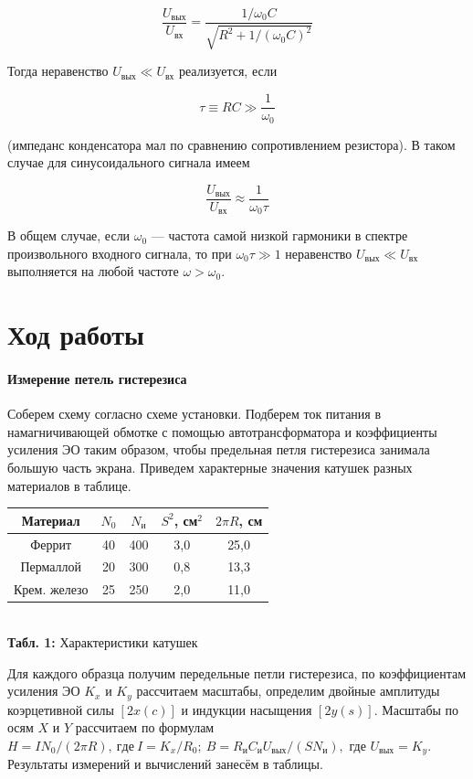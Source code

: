\documentclass[12pt,a4paper]{scrartcl}
\begin{document}
$$\frac{U_{\text{вых}}}{U_{\text{вх}}}=\frac{1/\omega_0C}{\sqrt{R^2+1/(\omega_0C)^2}}$$
	
Тогда неравенство $U_{\text{вых}} \ll U_{\text{вх}}$ реализуется, если 

$$\tau \equiv RC\gg \frac{1}{\omega_0}$$	
	
(импеданс конденсатора мал по сравнению сопротивлением резистора).
В таком случае для синусоидального сигнала имеем

$$\frac{U_{\text{вых}}}{U_{\text{вх}}}\approx\frac{1}{\omega_0\tau}$$

В общем случае, если $\omega_0$ — частота самой низкой гармоники в спектре
произвольного входного сигнала, то при $\omega_0\tau \gg 1$ неравенство $U_{\text{вых}} \ll U_{\text{вх}}$ выполняется на любой частоте $\omega > \omega_0$.	
	
\section{Ход работы}
\paragraph{Измерение петель гистерезиса} \hfill

Соберем схему согласно схеме установки. Подберем ток питания в намагничивающей обмотке с помощью автотрансформатора и коэффициенты усиления ЭО таким образом, чтобы предельная петля гистерезиса занимала большую часть экрана. Приведем характерные значения катушек разных материалов в таблице.	

\begin{center}
	\begin{tabular}{|c|c|c|c|c|}
		\hline
		Материал     & $N_0$ & $N_\text{и}$ & $S^2$, см$^2$ & $2\pi R$, см \\ \hline
		Феррит       & 40    & 400                              & 3,0           & 25,0         \\ \hline
		Пермаллой    & 20    & 300                              & 0,8           & 13,3         \\ \hline
		Крем. железо & 25    & 250                              & 2,0           & 11,0         \\ \hline
	\end{tabular}
	\\\textbf{Табл. 1:} Характеристики катушек
\end{center}
	
Для каждого образца получим передельные петли гистерезиса, по коэффициентам усиления ЭО $K_x$ и $K_y$ рассчитаем масштабы, определим двойные амплитуды коэрцетивной силы $ [2x(c)] $ и индукции насыщения $ [2y(s)] $. Масштабы по осям $ X $ и $ Y $ рассчитаем по формулам 
$H=IN_0/(2\pi R),\ где\ I=K_x/R_0;\ B=R_\text{и}C_\text{и}U_{\text{вых}}/(SN_\text{и}),$ где $U_{\text{вых}}=K_y$. Результаты измерений и вычислений занесём в таблицы.
\end{document}
